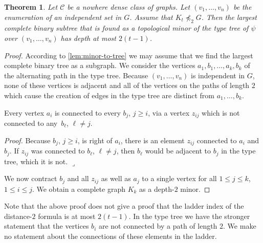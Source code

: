 \documentclass[11pt, fleqn]{article}
\theoremstyle{plain}
\newtheorem{theorem}{Theorem}
\theoremstyle{nonumberplain}
\newtheorem{proof}{Proof.}
\newcommand{\CCC}{\mathcal{C}}
\newcommand{\minor}{\preccurlyeq}
\begin{document}
\begin{theorem}
Let $\CCC$ be a nowhere dense class of graphs. Let 
$(v_1,\ldots, v_n)$ be the enumeration of an independent set 
in $G$. Assume that $K_t\not\minor_2G$. 
Then the largest complete binary subtree that is found as a topological minor 
of the type tree of $\psi$ over
$(v_1,\ldots, v_n)$ has depth at most $2(t-1)$. 
\end{theorem}
\begin{proof}
According to \cref{lem:minor-to-tree} we may assume that we find
the largest complete binary tree as a subgraph. We consider the
vertices $a_1,b_1,\ldots, a_k,b_k$ of the alternating path in the
type tree. Because $(v_1,\ldots, v_n)$ is independent in $G$, 
none of these vertices is adjacent and all of the vertices on the
paths of length $2$ which cause the creation of edges in the type
tree are distinct from $a_1,\ldots, b_k$. 

\begin{claim}
Every vertex $a_i$ is connected to every $b_j$, $j\geq i$,
via a vertex $z_{ij}$ which is not connected to any~$b_\ell$, $\ell\neq j$. 
\end{claim}

\noindent\textit{Proof.} Because $b_j$, $j\geq i$, is right of $a_i$, there is 
an element $z_{ij}$ connected to $a_i$ and $b_j$. If $z_{ij}$ was 
connected to $b_\ell$, $\ell\neq j$, then $b_\ell$ would be adjacent 
to $b_j$ in the type tree, which it is not. \hfill$\lrcorner$

\bigskip
We now contract $b_j$ and all $z_{ij}$ as well as $a_j$ to a single 
vertex for all $1\leq j\leq k$, $1\leq i\leq j$. We obtain a complete
graph $K_k$ as a depth-$2$ minor. 
\end{proof}

Note that the above proof does not give a proof that the ladder
index of the distance-$2$ formula is at most $2(t-1)$. In the type
tree we have the stronger statement that the vertices $b_i$
are not connected by a path of length $2$. 
We make no statement about the connections
of these elements in the ladder. 
\end{document}
